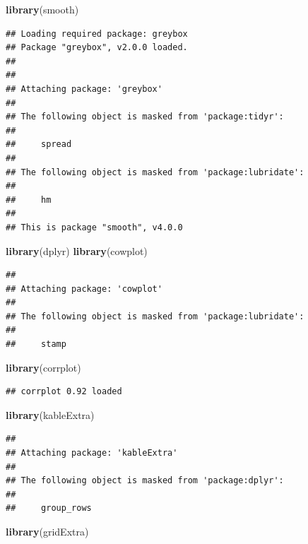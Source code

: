 \documentclass[
]{article}
\newenvironment{Shaded}{\begin{snugshade}}{\end{snugshade}}
\newcommand{\FunctionTok}[1]{\textcolor[rgb]{0.13,0.29,0.53}{\textbf{#1}}}
\newcommand{\NormalTok}[1]{#1}
\begin{document}
\begin{Shaded}
\begin{Highlighting}[]
\FunctionTok{library}\NormalTok{(smooth)}
\end{Highlighting}
\end{Shaded}

\begin{verbatim}
## Loading required package: greybox
## Package "greybox", v2.0.0 loaded.
## 
## 
## Attaching package: 'greybox'
## 
## The following object is masked from 'package:tidyr':
## 
##     spread
## 
## The following object is masked from 'package:lubridate':
## 
##     hm
## 
## This is package "smooth", v4.0.0
\end{verbatim}

\begin{Shaded}
\begin{Highlighting}[]
\FunctionTok{library}\NormalTok{(dplyr)}
\FunctionTok{library}\NormalTok{(cowplot)}
\end{Highlighting}
\end{Shaded}

\begin{verbatim}
## 
## Attaching package: 'cowplot'
## 
## The following object is masked from 'package:lubridate':
## 
##     stamp
\end{verbatim}

\begin{Shaded}
\begin{Highlighting}[]
\FunctionTok{library}\NormalTok{(corrplot)}
\end{Highlighting}
\end{Shaded}

\begin{verbatim}
## corrplot 0.92 loaded
\end{verbatim}

\begin{Shaded}
\begin{Highlighting}[]
\FunctionTok{library}\NormalTok{(kableExtra) }
\end{Highlighting}
\end{Shaded}

\begin{verbatim}
## 
## Attaching package: 'kableExtra'
## 
## The following object is masked from 'package:dplyr':
## 
##     group_rows
\end{verbatim}

\begin{Shaded}
\begin{Highlighting}[]
\FunctionTok{library}\NormalTok{(gridExtra)}
\end{Highlighting}
\end{Shaded}
\end{document}
